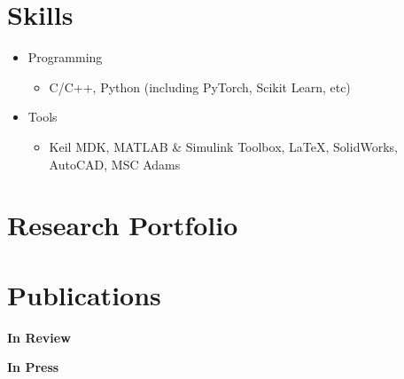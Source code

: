 \documentclass[letter,12pt]{article}
\begin{document}
\section{Skills}
\begin{itemize}[nosep,after=\strut, leftmargin=1em, itemsep=3pt]
    \item{Programming}
    \begin{itemize}
        \item C/C++, Python (including PyTorch, Scikit Learn, etc) 
    \end{itemize}
    \item{Tools}
    \begin{itemize}
        \item Keil MDK, MATLAB \& Simulink Toolbox, LaTeX, SolidWorks, AutoCAD, MSC Adams 
    \end{itemize}
\end{itemize}


\begin{comment}

\end{comment}


\newpage

\section{Research Portfolio}

\section{Publications}

\large \textbf{In Review} \hfill \\
\begin{refsection}
\nocite{*}
\printbibliography[heading=none]
\end{refsection}    

\large \textbf{In Press} \hfill \\
\begin{refsection}
\nocite{*}
\printbibliography[heading=none]
\end{refsection}    
\end{document}
